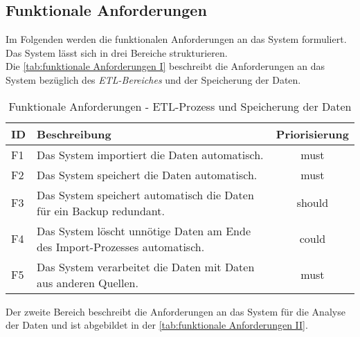 \subsection{Funktionale Anforderungen}
Im Folgenden werden die funktionalen Anforderungen an das System formuliert. Das System lässt sich in drei Bereiche strukturieren.\\
Die \autoref{tab:funktionale Anforderungen I} beschreibt die Anforderungen an das System bezüglich des \textit{ETL-Bereiches} und der Speicherung der Daten. 

\begingroup
\setlength{\tabcolsep}{10pt} %
\renewcommand{\arraystretch}{1.25}
\begin{table}[h]
    \centering
    \begin{adjustbox}{max width=\textwidth}
    \begin{tabular}{lp{13cm}c}
       \toprule
       \textbf{ID}          & \textbf{Beschreibung} &\textbf{Priorisierung}\\
       \midrule
        F1                               &Das System importiert die Daten automatisch. & must\\
        F2                               &Das System speichert die Daten automatisch.  & must\\
        F3                               &Das System speichert automatisch die Daten für ein Backup redundant.  & should\\
        F4                               &Das System löscht unnötige Daten am Ende des Import-Prozesses automatisch.  & could\\
        F5                               &Das System verarbeitet die Daten mit Daten aus anderen Quellen.  & must\\
    \bottomrule
    \end{tabular}
    \end{adjustbox}
    \caption{%
        Funktionale Anforderungen - ETL-Prozess und Speicherung der Daten
    }
    \label{tab:funktionale Anforderungen I}
    \end{table}
\endgroup

Der zweite Bereich beschreibt die Anforderungen an das System für die Analyse der Daten und ist abgebildet in der \autoref{tab:funktionale Anforderungen II}.

